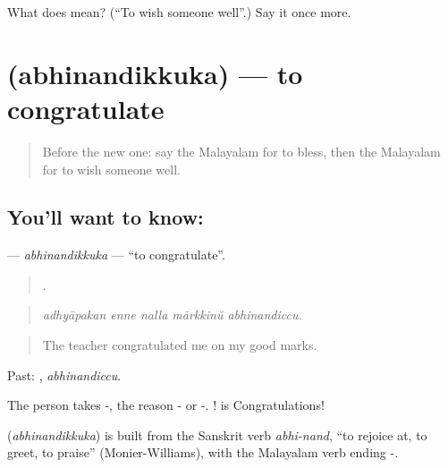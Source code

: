 \begin{tcolorbox}[breakable,colback=teal!4,colframe=teal!35!black,title={Before you move on}]
What does  mean? (\textquotedblleft{}To wish someone well\textquotedblright{}.) Say it once more.
\end{tcolorbox}
\section[\texorpdfstring{\ml{അഭിനന്ദിക്കുക} (abhinandikkuka)}{അഭിനന്ദിക്കുക (abhinandikkuka)}]{ (abhinandikkuka) — to congratulate}

\label{lesson:ML-C388-abhinandikkuka}



\begin{quote}
Before the new one: say the Malayalam for to bless, then the Malayalam for to wish someone well.
\end{quote}

\subsection*{You'll want to know: }
\textbf{} — \emph{abhinandikkuka} — \textquotedblleft{}to congratulate\textquotedblright{}.

\begin{quote}
    .
\end{quote}

\begin{quote}
\emph{adhyāpakan enne nalla mārkkinŭ abhinandiccu.}
\end{quote}

\begin{quote}
The teacher congratulated me on my good marks.
\end{quote}

Past: , \emph{abhinandiccu}.

The person takes -, the reason - or -. ! is Congratulations!

\begin{cousinweb}
\textbf{} (\emph{abhinandikkuka}) is built from the Sanskrit verb \emph{abhi-nand}, \textquotedblleft{}to rejoice at, to greet, to praise\textquotedblright{} (Monier-Williams), with the Malayalam verb ending -.
\end{cousinweb}

